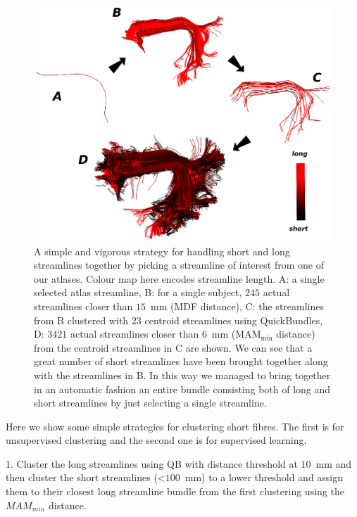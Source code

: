 \documentclass{bioinfo}
\begin{document}
%
\begin{figure}
\begin{centering}
\includegraphics[scale=0.65]{Figures/Fig_10_arcuate_small_fibers}
\par\end{centering}
\caption{A simple and vigorous strategy for handling short and long
  streamlines together by picking a streamline of interest from one of
  our atlases. Colour map here encodes streamline length. A: a single
  selected atlas streamline, B: for a single subject, $245$ actual
  streamlines closer than $15$~mm (MDF distance), C: the streamlines
  from B clustered with $23$ centroid streamlines using QuickBundles, D:
  $\num{3421}$ actual streamlines closer than $6$~mm
  ($\textrm{MAM}_{\textrm{min}}$ distance) from the centroid streamlines
  in C are shown. We can see that a great number of short streamlines
  have been brought together along with the streamlines in B. In this
  way we managed to bring together in an automatic fashion an entire
  bundle consisting both of long and short streamlines by just selecting
  a single streamline.\label{Flo:arcuate_close}}
\end{figure}

Here we show some simple strategies for clustering short fibres. The
first is for unsupervised clustering and the second one is for
supervised learning.

1. Cluster the long streamlines using QB with distance threshold at
$10$~mm and then cluster the short streamlines (<$100$~mm) to a lower
threshold and assign them to their closest long streamline bundle from
the first clustering using the $MAM_{min}$ distance.
\end{document}
